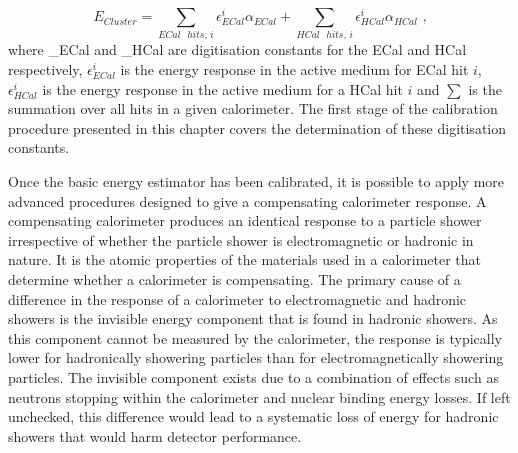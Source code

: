 %
\begin{equation}
E_{Cluster} = \sum_{ECal \text{ } hits \text{, }i} \epsilon^{i}_{ECal} \alpha_{ECal} + \sum_{HCal \text{ } hits \text{, }i} \epsilon^{i}_{HCal} \alpha_{HCal} \text{ ,}
\end{equation}
%
\noindent where \alpha_{ECal} and \alpha_{HCal} are digitisation constants for the ECal and HCal respectively, $\epsilon^{i}_{ECal}$ is the energy response in the active medium for ECal hit $i$, $\epsilon^{i}_{HCal}$ is the energy response in the active medium for a HCal hit $i$ and $\sum$ is the summation over all hits in a given calorimeter.  The first stage of the calibration procedure presented in this chapter covers the determination of these digitisation constants.  

Once the basic energy estimator has been calibrated, it is possible to apply more advanced procedures designed to give a compensating calorimeter response.  A compensating calorimeter produces an identical response to a particle shower irrespective of whether the particle shower is electromagnetic or hadronic in nature.  It is the atomic properties of the materials used in a calorimeter that determine whether a calorimeter is compensating.  The primary cause of a difference in the response of a calorimeter to electromagnetic and hadronic showers is the invisible energy component that is found in hadronic showers.  As this component cannot be measured by the calorimeter, the response is typically lower for hadronically showering particles than for electromagnetically showering particles.  The invisible component exists due to a combination of effects such as neutrons stopping within the calorimeter and nuclear binding energy losses.  If left unchecked, this difference would lead to a systematic loss of energy for hadronic showers that would harm detector performance.  

